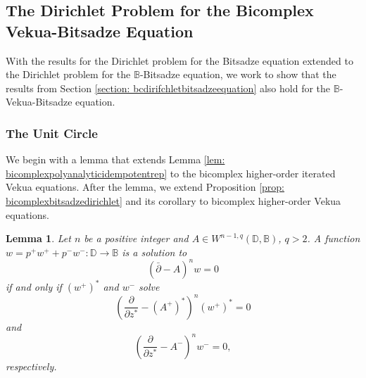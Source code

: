 \documentclass[12pt,reqno]{amsart}
\newtheorem{lem}[theorem]{Lemma}
\theoremstyle{definition}
\theoremstyle{remark}
\newcommand{\p}{\partial}
\newcommand{\dbar}{\bar\partial}
\newcommand{\bc}{\mathbb{B}}
\newcommand{\disk}{\mathbb{D}}
\begin{document}
    \subsection{The Dirichlet Problem for the Bicomplex Vekua-Bitsadze Equation}

        With the results for the Dirichlet problem for the Bitsadze equation extended to the Dirichlet problem for the $\bc$-Bitsadze equation, we work to show that the results from Section \ref{section: bcdirifchletbitsadzeequation} also hold for the $\bc$-Vekua-Bitsadze equation. 

    

        \subsubsection{The Unit Circle}

        We begin with a lemma that extends Lemma \ref{lem: bicomplexpolyanalyticidempotentrep} to the bicomplex higher-order iterated Vekua equations. After the lemma, we extend Proposition \ref{prop: bicomplexbitsadzedirichlet} and its corollary to bicomplex higher-order Vekua equations. 


            \begin{lem}\label{lem: bicomplexhoividempotentrep}
                Let $n$ be a positive integer and $A \in W^{n-1, q}(\disk,\bc)$, $q>2$. A function $w = p^+ w^+ + p^- w^-: \disk \to \bc$ is a solution to
                \[
                    (\dbar- A)^n w = 0
                \]
                if and only if $(w^+)^*$ and $w^-$ solve 
                \[
                   \left( \frac{\p }{\p z^*}- (A^+)^*\right)^n (w^+)^* = 0
                \]
                and 
                \[
                    \left( \frac{\p}{\p z^*} - A^-\right)^n w^- = 0,
                \]
                respectively. 
            \end{lem}
\end{document}
